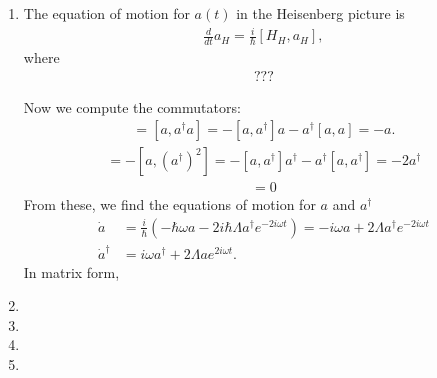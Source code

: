 \documentclass{article}
\theoremstyle{definition}
\newcommand{\f}[2]{\frac{#1}{#2}}
\newcommand{\lp}{\left(}
\newcommand{\rp}{\right)}
\begin{document}
\begin{enumerate}[label=(\alph*)]

\item The equation of motion for $a(t)$ in the Heisenberg picture is 
\begin{align*}
\f{d}{dt}a_H = \f{i}{\hbar} [H_H, a_H],
\end{align*}
where
\begin{align*}
???
\end{align*}


Now we compute the commutators:
\begin{align*}
[a^\dagger a , a] = [a,a^\dagger a] = -[a,a^\dagger] a - a^\dagger [a,a] = -a.
\end{align*}
\begin{align*}
[(a^\dagger)^2, a] = -[a,(a^\dagger)^2] = -[a,a^\dagger]a^\dagger - a^\dagger [a, a^\dagger] = -2a^\dagger
\end{align*}
 \begin{align*}
 [a^2,a] = 0
\end{align*}
From these, we find the equations of motion for $a$ and $a^\dagger$
\begin{align*}
\dot a  
&= \f{i}{\hbar} \lp - \hbar \omega a  -2 i \hbar \Lambda a^\dagger e^{-2i\omega t}  \rp =  -i \omega a + 2 \Lambda a^\dagger e^{-2i\omega t } \\
\dot a^\dagger
&= i \omega a^\dagger + 2\Lambda a e^{2i\omega t}.
\end{align*}
In matrix form, 


\item 


\item 

\item 


\item 

\end{enumerate}
\end{document}
